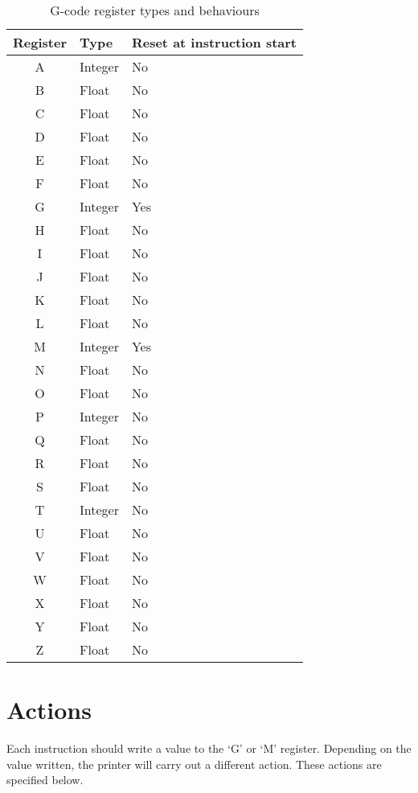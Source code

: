 			\begin{table}[H]
				\centering
				\begin{tabular}{c l l}
					\toprule
					Register & Type & Reset at instruction start \\
					\midrule
						A & Integer & No  \\
						B & Float   & No  \\
						C & Float   & No  \\
						D & Float   & No  \\
						E & Float   & No  \\
						F & Float   & No  \\
						G & Integer & Yes \\
						H & Float   & No  \\
						I & Float   & No  \\
						J & Float   & No  \\
						K & Float   & No  \\
						L & Float   & No  \\
						M & Integer & Yes \\
						N & Float   & No  \\
						O & Float   & No  \\
						P & Integer & No  \\
						Q & Float   & No  \\
						R & Float   & No  \\
						S & Float   & No  \\
						T & Integer & No  \\
						U & Float   & No  \\
						V & Float   & No  \\
						W & Float   & No  \\
						X & Float   & No  \\
						Y & Float   & No  \\
						Z & Float   & No  \\
					\bottomrule
				\end{tabular}
				
				\caption{G-code register types and behaviours}
				\label{tab:gcoderegisters}
			\end{table}
	
	\section{Actions}
		
		\label{sec:gcodeactions}
		
		Each instruction should write a value to the `G' or `M' register. Depending
		on the value written, the printer will carry out a different action. These
		actions are specified below.
		
